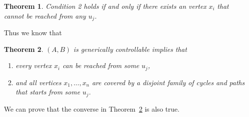 \documentclass{article}
\newtheorem{theorem}{Theorem}
\begin{document}
\begin{theorem}
  Condition 2 holds if and only if there exists an vertex $x_i$ that cannot be reached from any $u_j$.
\end{theorem}

Thus we know that
\begin{theorem}
  $(A,B)$ is generically controllable implies that 
  \begin{enumerate}
    \item every vertex $x_i$ can be reached from some $u_j$, 
    \item and all vertices $x_1,\dots,x_n$ are covered by a disjoint family of cycles and paths that starts from some $u_j$.
  \end{enumerate}
  \label{theorem:genericcontrollability}
\end{theorem}
We can prove that the converse in Theorem~\ref{theorem:genericcontrollability} is also true. 
\end{document}
